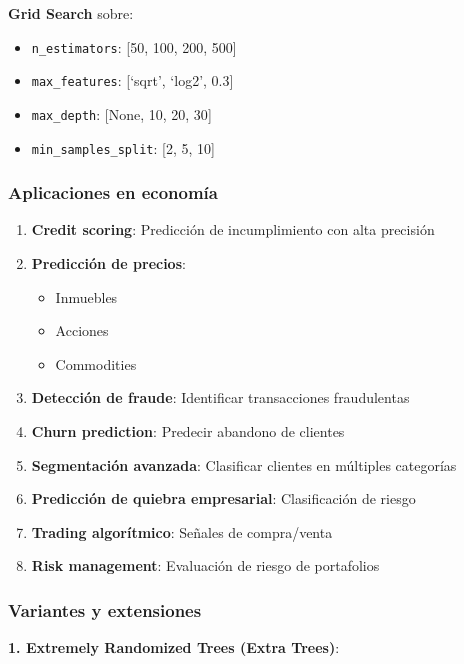 \documentclass[
  doc,
  floatsintext,
  longtable,
  a4paper,
  nolmodern,
  notxfonts,
  notimes,
  12pt,
  colorlinks=true,linkcolor=blue,citecolor=blue,urlcolor=blue]{apa7}
\providecommand{\tightlist}{%
  \setlength{\itemsep}{0pt}\setlength{\parskip}{0pt}}
\begin{document}
\textbf{Grid Search} sobre:

\begin{itemize}
\tightlist
\item
  \texttt{n\_estimators}: {[}50, 100, 200, 500{]}
\item
  \texttt{max\_features}: {[}`sqrt', `log2', 0.3{]}
\item
  \texttt{max\_depth}: {[}None, 10, 20, 30{]}
\item
  \texttt{min\_samples\_split}: {[}2, 5, 10{]}
\end{itemize}

\subsubsection{Aplicaciones en
economía}\label{aplicaciones-en-economuxeda-2}

\begin{enumerate}
\def\labelenumi{\arabic{enumi}.}
\item
  \textbf{Credit scoring}: Predicción de incumplimiento con alta
  precisión
\item
  \textbf{Predicción de precios}:

  \begin{itemize}
  \tightlist
  \item
    Inmuebles
  \item
    Acciones
  \item
    Commodities
  \end{itemize}
\item
  \textbf{Detección de fraude}: Identificar transacciones fraudulentas
\item
  \textbf{Churn prediction}: Predecir abandono de clientes
\item
  \textbf{Segmentación avanzada}: Clasificar clientes en múltiples
  categorías
\item
  \textbf{Predicción de quiebra empresarial}: Clasificación de riesgo
\item
  \textbf{Trading algorítmico}: Señales de compra/venta
\item
  \textbf{Risk management}: Evaluación de riesgo de portafolios
\end{enumerate}

\subsubsection{Variantes y extensiones}\label{variantes-y-extensiones}

\textbf{1. Extremely Randomized Trees (Extra Trees)}:
\end{document}
